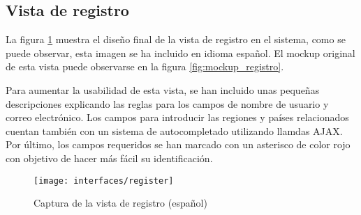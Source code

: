 \subsection{Vista de registro}
La figura \ref{fig:interface_registro} muestra el diseño final de la vista de registro en el sistema,  como se puede observar, esta imagen se ha incluido en idioma español.  El mockup original de esta vista puede observarse en la figura \ref{fig:mockup_registro}.

Para aumentar la usabilidad de esta vista, se han incluido unas pequeñas descripciones explicando las reglas para los campos de nombre de usuario y correo electrónico.  Los campos para introducir las regiones y países relacionados cuentan también con un sistema de autocompletado utilizando llamdas AJAX.  Por último, los campos requeridos se han marcado con un asterisco de color rojo con objetivo de hacer más fácil su identificación.
\begin{figure}[h]
	\centering
	\texttt{[image: interfaces/register]}
	\caption{Captura de la vista de registro (español)}
	\label{fig:interface_registro}
\end{figure}


